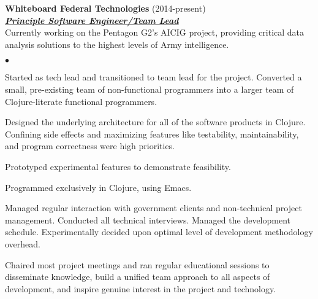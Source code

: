 \documentclass{article}
\newcommand{\employer}[3]{{ \textbf{#1} (#2)\\ \underline{\textbf{\emph{#3}}}\\  }}
\newenvironment{achievements}{\begin{list}{$\bullet$}{\topsep 0pt \itemsep
      -2pt}}{\vspace*{4pt}\end{list}}
\begin{document}
\employer{Whiteboard Federal Technologies}{2014-present}{Principle Software
  Engineer/Team Lead} Currently working on the Pentagon G2's AICIG project,
providing critical data analysis solutions to the highest levels of Army
intelligence.
\begin{achievements}
\item Started as tech lead and transitioned to team lead for the project.
  Converted a small, pre-existing team of non-functional programmers into a
  larger team of Clojure-literate functional programmers.
\item Designed the underlying architecture for all of the software products in
  Clojure.  Confining side effects and maximizing features like testability,
  maintainability, and program correctness were high priorities.
\item Prototyped experimental features to demonstrate feasibility.
\item Programmed exclusively in Clojure, using Emacs.
\item Managed regular interaction with government clients and non-technical
  project management.  Conducted all technical interviews.  Managed the
  development schedule.  Experimentally decided upon optimal level of
  development methodology overhead.
\item Chaired most project meetings and ran regular educational sessions to
  disseminate knowledge, build a unified team approach to all aspects of
  development, and inspire genuine interest in the project and technology.
\end{achievements}
\end{document}
